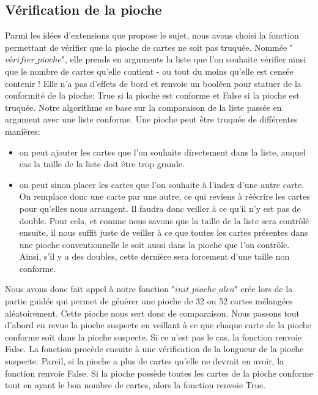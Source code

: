 \documentclass[10pt,a4paper,french,titlepage]{article}
\theoremstyle{definition}
\begin{document}
\subsection{Vérification de la pioche}
Parmi les idées d'extensions que propose le sujet, nous avons choisi la fonction permettant de vérifier que la pioche de cartes ne soit pas truquée. Nommée "$vérifier\_pioche$", elle prends en arguments la liste que l'on souhaite vérifier ainsi que le nombre de cartes qu'elle contient - ou tout du moins qu'elle est censée contenir ! Elle n'a pas d'effets de bord et renvoie un booléen pour statuer de la conformité de la pioche: True si la pioche est conforme et False si la pioche est truquée. Notre algorithme se base sur la comparaison de la liste passée en argument avec une liste conforme. Une pioche peut être truquée de différentes manières:
\begin{itemize}
\item on peut ajouter les cartes que l'on souhaite directement dans la liste, auquel cas la taille de la liste doit être trop grande.
\item on peut sinon placer les cartes que l'on souhaite à l'index d'une autre carte. On remplace donc une carte par une autre, ce qui reviens à réécrire les cartes pour qu'elles nous arrangent. Il faudra donc veiller à ce qu'il n'y est pas de double. Pour cela, et comme nous savons que la taille de la liste sera contrôlé ensuite, il nous suffit juste de veiller à ce que toutes les cartes présentes dans une pioche conventionnelle le soit aussi dans la pioche que l'on contrôle. Ainsi, s'il y a des doubles, cette dernière sera forcement d'une taille non conforme.
\end{itemize}

Nous avons donc fait appel à notre fonction "$init\_pioche\_alea$" crée lors de la partie guidée qui permet de générer une pioche de 32 ou 52 cartes mélangées aléatoirement\label{piochealea}. Cette pioche nous sert donc de comparaison. Nous passons tout d'abord en revue la pioche suspecte en veillant à ce que chaque carte de la pioche conforme soit dans la pioche suspecte. Si ce n'est pas le cas, la fonction renvoie False. La fonction procède ensuite à une vérification de la longueur de la pioche suspecte. Pareil, si la pioche a plus de cartes qu'elle ne devrait en avoir, la fonction renvoie False. Si la pioche possède toutes les cartes de la pioche conforme tout en ayant le bon nombre de cartes, alors la fonction renvoie True.
\end{document}
